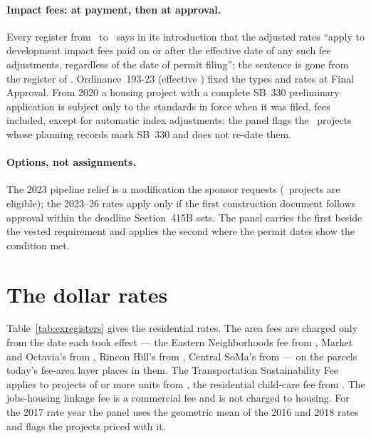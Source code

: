 \documentclass[11pt]{article}
\newcommand{\extable}[1]{\FloatBarrier\def\extab{#1}}
\begin{document}
\paragraph{Impact fees: at payment, then at approval.} Every register from \exPaySentenceFirst\ to
\exPaySentenceLast\ says in its introduction that the adjusted rates ``apply to development impact fees paid on or after the effective date of any
such fee adjustments, regardless of the date of permit filing''; the sentence is gone from the register of
\exPaySentenceAbsent. Ordinance~193-23 (effective ) fixed the types and
rates at Final Approval. From 2020 a housing project
with a complete SB~330 preliminary application is subject only to the standards in force when
it was filed, fees included, except for automatic index adjustments; the panel flags the
\exSbThreeThirty\ projects whose planning records mark SB~330 and does not re-date them.

\paragraph{Options, not assignments.} The 2023 pipeline relief is a modification the sponsor
requests (\exPipe\ projects are eligible); the 2023--26 rates apply only if the first
construction document follows approval within the deadline Section~415B sets. The panel carries the first beside the vested requirement and applies the
second where the permit dates show the condition met.

\section{The dollar rates}\label{sec:exrates}

\extable{exregisters}

Table~\ref{tab:exregisters} gives the residential rates. The area fees are charged only from
the date each took effect --- the Eastern Neighborhoods fee from , Market and
Octavia's from , Rincon Hill's from , Central SoMa's from
 --- on the parcels today's fee-area layer places in them. The Transportation
Sustainability Fee applies to projects of  or more units from , the
residential child-care fee from . The jobs-housing linkage fee is a commercial
fee and is not charged to housing. For the 2017 rate year the panel uses the geometric mean of
the 2016 and 2018 rates and flags the projects priced with it.
\end{document}
